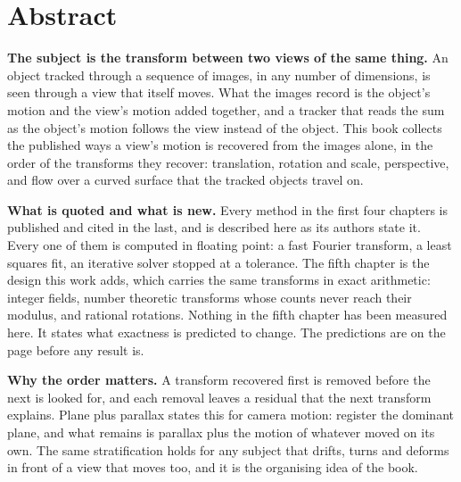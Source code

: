 \chapter*{Abstract}

\textbf{The subject is the transform between two views of the same thing.} An object tracked through
a sequence of images, in any number of dimensions, is seen through a view that itself moves. What
the images record is the object's motion and the view's motion added together, and a tracker that
reads the sum as the object's motion follows the view instead of the object. This book collects the
published ways a view's motion is recovered from the images alone, in the order of the transforms
they recover: translation, rotation and scale, perspective, and flow over a curved surface that the
tracked objects travel on.

\textbf{What is quoted and what is new.} Every method in the first four chapters is published and
cited in the last, and is described here as its authors state it. Every one of them is computed in
floating point: a fast Fourier transform, a least squares fit, an iterative solver stopped at a
tolerance. The fifth chapter is the design this work adds, which carries the same transforms in
exact arithmetic: integer fields, number theoretic transforms whose counts never reach their
modulus, and rational rotations. Nothing in the fifth chapter has been measured here. It states what
exactness is predicted to change. The predictions are on the page before any result is.

\textbf{Why the order matters.} A transform recovered first is removed before the next is looked
for, and each removal leaves a residual that the next transform explains. Plane plus parallax states
this for camera motion: register the dominant plane, and what remains is parallax plus the motion of
whatever moved on its own. The same stratification holds for any subject that drifts, turns and
deforms in front of a view that moves too, and it is the organising idea of the book.
